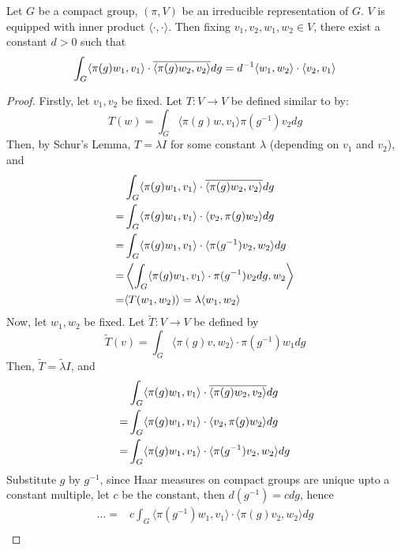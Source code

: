 \begin{thm} \label{schur-ortho-2}
  Let $G$ be a compact group, $(\pi,V)$ be an irreducible representation of $G$.
  $V$ is equipped with inner product $\langle \cdot,\cdot \rangle$.
  Then fixing $v_1,v_2,w_1,w_2 \in V$, there exist a constant $d > 0$ such that
  \[
    \int_G \langle \pi(g)w_1, v_1 \rangle \cdot \overline{\langle \pi(g)w_2, v_2 \rangle} dg
    = d^{-1} \langle w_1, w_2 \rangle \cdot \langle v_2, v_1 \rangle
  \]
\end{thm}

\begin{proof}
  Firstly, let $v_1, v_2$ be fixed.  Let $T : V \to V$ be defined similar to
   by:
  \[
    T(w) = \int_G \langle \pi(g)w, v_1 \rangle \pi(g^{-1})v_2 dg
  \]
  Then, by Schur's Lemma, $T = \lambda I$ for some constant $\lambda$ (depending
  on $v_1$ and $v_2$), and
  \begin{align*}
      & \int_G \langle \pi(g)w_1, v_1 \rangle \cdot \overline{\langle \pi(g)w_2, v_2 \rangle} dg\\
    = & \int_G \langle \pi(g)w_1, v_1 \rangle \cdot \langle v_2, \pi(g)w_2\rangle dg\\
    = & \int_G \langle \pi(g)w_1, v_1 \rangle \cdot \langle \pi(g^{-1})v_2, w_2\rangle dg\\
    = & \left\langle \int_G \langle \pi(g)w_1, v_1 \rangle \cdot \pi(g^{-1})v_2 dg , w_2 \right\rangle\\
    = & \langle T(w_1, w_2) \rangle = \lambda \langle w_1,w_2 \rangle
  \end{align*}
  Now, let $w_1, w_2$ be fixed. Let $\widetilde{T} : V \to V$ be defined by
  \[
    \widetilde{T}(v) = \int_G \langle \pi(g)v, w_2 \rangle \cdot \pi(g^{-1})w_1 dg
  \]
  Then, $\widetilde{T} = \widetilde{\lambda} I$, and
  \begin{align*}
      & \int_G \langle \pi(g)w_1, v_1 \rangle \cdot \overline{\langle \pi(g)w_2, v_2 \rangle} dg\\
    = & \int_G \langle \pi(g)w_1, v_1 \rangle \cdot \langle v_2, \pi(g)w_2 \rangle dg\\
    = & \int_G \langle \pi(g)w_1, v_1 \rangle \cdot \langle \pi(g^{-1})v_2, w_2 \rangle dg
  \end{align*}
  Substitute $g$ by $g^{-1}$, since Haar measures on compact groups are unique
  upto a constant multiple, let $c$ be the constant, then $d(g^{-1}) = cdg$,
  hence
  \begin{align*}
    \ldots = & c \int_G \langle \pi(g^{-1})w_1, v_1 \rangle \cdot \langle \pi(g)v_2, w_2 \rangle dg\\

\end{align*}
\end{proof}
